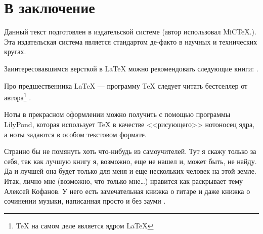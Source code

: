 \chapter*{В заключение}


Данный текст подготовлен в издательской системе {\LaTeXe} (автор использовал MiC\TeX.). Эта издательская система является стандартом де-факто в научных и технических кругах.

Заинтересовавшимся версткой в {\LaTeX} можно рекомендовать следующие книги: \cite{bib:cotelnikov,bib:baldin}.

Про предшественника {\LaTeX} --- программу {\TeX} следует читать бестселлер от автора\footnote{{\TeX} на самом деле является ядром \LaTeX} \cite{bib:knuth:AllAbout}.

Ноты в прекрасном оформлении можно получить с помощью программы LilyPond, которая использует {\TeX} в качестве <<рисующего>> нотоносец ядра, а ноты задаются в особом текстовом формате.

Странно бы не помянуть хоть что-нибудь из самоучителей. Тут я скажу только за себя, так как лучшую книгу я, возможно, еще не нашел и, может быть, не найду. Да и лучшей она будет только для меня и еще нескольких человек на этой земле. Итак, лично мне (возможно, что только мне\ldots) нравится как раскрывает тему Алексей Кофанов. У него есть замечательная книжка о гитаре \cite{bib:kofanov:AboutGuitar} и даже книжка о сочинении музыки, написанная просто и без зауми \cite{bib:kofanov:MusicGeneration}.
